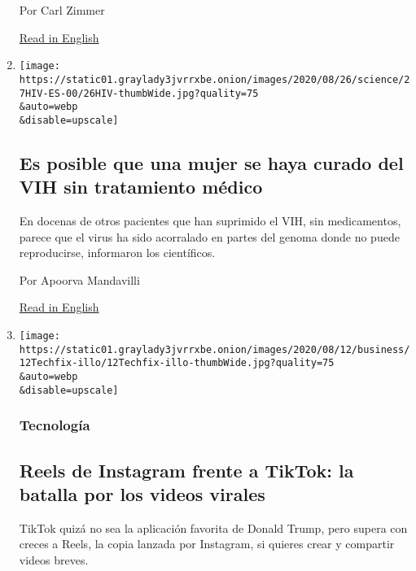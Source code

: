 \begin{enumerate}
  Por Carl Zimmer

  \href{https://www.nytimes3xbfgragh.onion/2020/08/27/health/covid-19-vaccines.html}{Read
  in English}
\item
  \href{/es/2020/08/28/espanol/ciencia-y-tecnologia/cura-vih.html}{}

  \texttt{[image: https://static01.graylady3jvrrxbe.onion/images/2020/08/26/science/27HIV-ES-00/26HIV-thumbWide.jpg?quality=75\\\&auto=webp\\\&disable=upscale]}

  \hypertarget{es-posible-que-una-mujer-se-haya-curado-del-vih-sin-tratamiento-muxe9dico}{%
  \subsection{Es posible que una mujer se haya curado del VIH sin
  tratamiento
  médico}\label{es-posible-que-una-mujer-se-haya-curado-del-vih-sin-tratamiento-muxe9dico}}

  En docenas de otros pacientes que han suprimido el VIH, sin
  medicamentos, parece que el virus ha sido acorralado en partes del
  genoma donde no puede reproducirse, informaron los científicos.

  Por Apoorva Mandavilli

  \href{https://www.nytimes3xbfgragh.onion/2020/08/26/health/hiv-cure.html}{Read
  in English}
\item
  \href{/es/2020/08/27/espanol/ciencia-y-tecnologia/instagram-reels-tik-tok.html}{}

  \texttt{[image: https://static01.graylady3jvrrxbe.onion/images/2020/08/12/business/12Techfix-illo/12Techfix-illo-thumbWide.jpg?quality=75\\\&auto=webp\\\&disable=upscale]}

  \hypertarget{tecnologuxeda}{%
  \subsubsection{Tecnología}\label{tecnologuxeda}}

  \hypertarget{reels-de-instagram-frente-a-tiktok-la-batalla-por-los-videos-virales}{%
  \subsection{Reels de Instagram frente a TikTok: la batalla por los
  videos
  virales}\label{reels-de-instagram-frente-a-tiktok-la-batalla-por-los-videos-virales}}

  TikTok quizá no sea la aplicación favorita de Donald Trump, pero
  supera con creces a Reels, la copia lanzada por Instagram, si quieres
  crear y compartir videos breves.


\end{enumerate}
